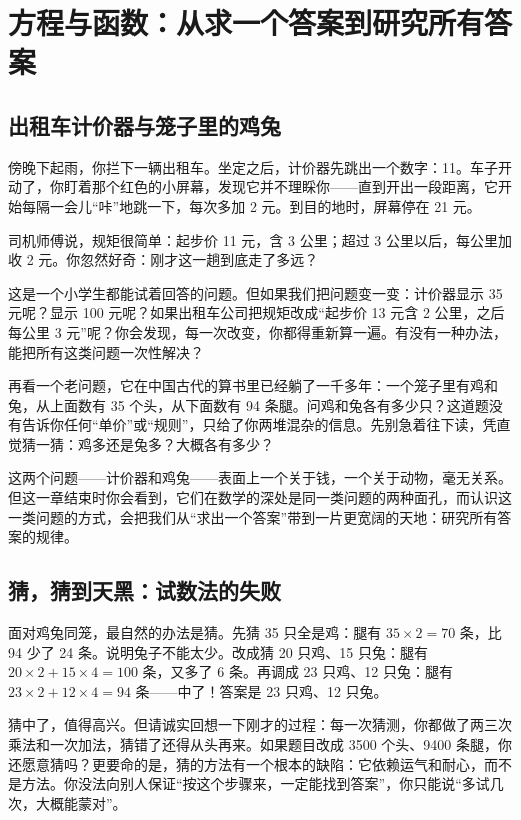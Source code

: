 \chapter{方程与函数：从求一个答案到研究所有答案}

\section{出租车计价器与笼子里的鸡兔}

傍晚下起雨，你拦下一辆出租车。坐定之后，计价器先跳出一个数字：11。车子开动了，你盯着那个红色的小屏幕，发现它并不理睬你——直到开出一段距离，它开始每隔一会儿“咔”地跳一下，每次多加 2 元。到目的地时，屏幕停在 21 元。

司机师傅说，规矩很简单：起步价 11 元，含 3 公里；超过 3 公里以后，每公里加收 2 元。你忽然好奇：刚才这一趟到底走了多远？

这是一个小学生都能试着回答的问题。但如果我们把问题变一变：计价器显示 35 元呢？显示 100 元呢？如果出租车公司把规矩改成“起步价 13 元含 2 公里，之后每公里 3 元”呢？你会发现，每一次改变，你都得重新算一遍。有没有一种办法，能把所有这类问题一次性解决？

再看一个老问题，它在中国古代的算书里已经躺了一千多年：一个笼子里有鸡和兔，从上面数有 35 个头，从下面数有 94 条腿。问鸡和兔各有多少只？这道题没有告诉你任何“单价”或“规则”，只给了你两堆混杂的信息。先别急着往下读，凭直觉猜一猜：鸡多还是兔多？大概各有多少？

这两个问题——计价器和鸡兔——表面上一个关于钱，一个关于动物，毫无关系。但这一章结束时你会看到，它们在数学的深处是同一类问题的两种面孔，而认识这一类问题的方式，会把我们从“求出一个答案”带到一片更宽阔的天地：研究所有答案的规律。

\section{猜，猜到天黑：试数法的失败}

面对鸡兔同笼，最自然的办法是猜。先猜 35 只全是鸡：腿有 $35 \times 2 = 70$ 条，比 94 少了 24 条。说明兔子不能太少。改成猜 20 只鸡、15 只兔：腿有 $20 \times 2 + 15 \times 4 = 100$ 条，又多了 6 条。再调成 23 只鸡、12 只兔：腿有 $23 \times 2 + 12 \times 4 = 94$ 条——中了！答案是 23 只鸡、12 只兔。

猜中了，值得高兴。但请诚实回想一下刚才的过程：每一次猜测，你都做了两三次乘法和一次加法，猜错了还得从头再来。如果题目改成 3500 个头、9400 条腿，你还愿意猜吗？更要命的是，猜的方法有一个根本的缺陷：它依赖运气和耐心，而不是方法。你没法向别人保证“按这个步骤来，一定能找到答案”，你只能说“多试几次，大概能蒙对”。

